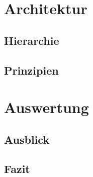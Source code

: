 \section{Architektur}  %
\subsection{Hierarchie}  %
\subsection{Prinzipien}  %

\section{Auswertung}  %
\subsection{Ausblick}  %
\subsection{Fazit}  %


\appendix
\printbibliography[heading=bibintoc,title={Quellenverzeichnis}]
\listoffigures


